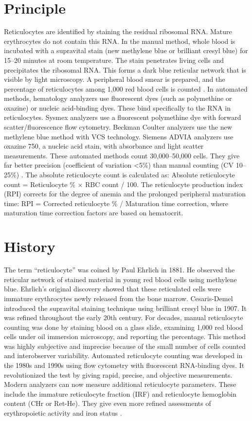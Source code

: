\section*{Principle}
Reticulocytes are identified by staining the residual ribosomal RNA. Mature erythrocytes do not contain this RNA. In the manual method, whole blood is incubated with a supravital stain (new methylene blue or brilliant cresyl blue) for 15--20 minutes at room temperature. The stain penetrates living cells and precipitates the ribosomal RNA. This forms a dark blue reticular network that is visible by light microscopy. A peripheral blood smear is prepared, and the percentage of reticulocytes among 1,000 red blood cells is counted \cite{bain2017dacie}. In automated methods, hematology analyzers use fluorescent dyes (such as polymethine or oxazine) or nucleic acid-binding dyes. These bind specifically to the RNA in reticulocytes. Sysmex analyzers use a fluorescent polymethine dye with forward scatter/fluorescence flow cytometry. Beckman Coulter analyzers use the new methylene blue method with VCS technology. Siemens ADVIA analyzers use oxazine 750, a nucleic acid stain, with absorbance and light scatter measurements. These automated methods count 30,000--50,000 cells. They give far better precision (coefficient of variation <5\%) than manual counting (CV 10--25\%) \cite{tietz2012textbook}. The absolute reticulocyte count is calculated as: Absolute reticulocyte count = Reticulocyte \%  $\times$  RBC count / 100. The reticulocyte production index (RPI) corrects for the degree of anemia and the prolonged peripheral maturation time: RPI = Corrected reticulocyte \% / Maturation time correction, where maturation time correction factors are based on hematocrit.

\section*{History}
The term ``reticulocyte'' was coined by Paul Ehrlich in 1881. He observed the reticular network of stained material in young red blood cells using methylene blue. Ehrlich's original discovery showed that these reticulated cells were immature erythrocytes newly released from the bone marrow. Cesaris-Demel introduced the supravital staining technique using brilliant cresyl blue in 1907. It was refined throughout the early 20th century. For decades, manual reticulocyte counting was done by staining blood on a glass slide, examining 1,000 red blood cells under oil immersion microscopy, and reporting the percentage. This method was highly subjective and imprecise because of the small number of cells counted and interobserver variability. Automated reticulocyte counting was developed in the 1980s and 1990s using flow cytometry with fluorescent RNA-binding dyes. It revolutionized the test by giving rapid, precise, and objective measurements. Modern analyzers can now measure additional reticulocyte parameters. These include the immature reticulocyte fraction (IRF) and reticulocyte hemoglobin content (CHr or Ret-He). They give even more refined assessments of erythropoietic activity and iron status \cite{brugnara2000reticulocyte}.

